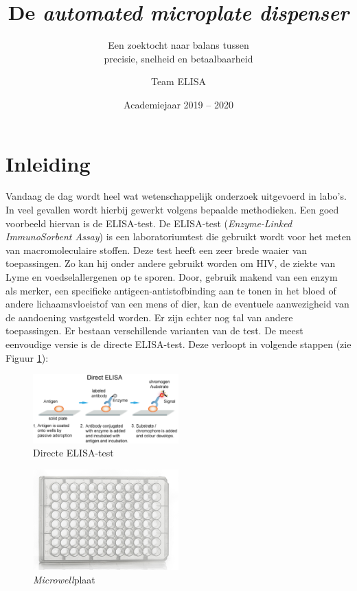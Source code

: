 \documentclass[a4paper,twoside,kulak]{kulakreport} %
\title{De \textit{automated microplate dispenser}}
\subtitle{Een zoektocht naar balans tussen \\ precisie, snelheid en betaalbaarheid}
\author{Team ELISA}
\institute{Matthias Derez, Maxime Dujardin, Korneel Verkens, Seppe Vilain \\
Begeleiders: Charlotte Dekimpe, Arvid Martens, Karen Vanhoorelbeke}
\date{Academiejaar 2019 -- 2020}
\begin{document}

\titlepage

\tableofcontents

\chapter*{Inleiding}

Vandaag de dag wordt heel wat wetenschappelijk onderzoek uitgevoerd in labo's. In veel gevallen wordt hierbij gewerkt volgens bepaalde methodieken. Een goed voorbeeld hiervan is de ELISA-test. De ELISA-test (\textit{Enzyme-Linked ImmunoSorbent Assay}\cite{naamELISA}) is een laboratoriumtest die gebruikt wordt voor het meten van macromoleculaire stoffen. Deze test heeft een zeer brede waaier van toepassingen. Zo kan hij onder andere gebruikt worden om HIV, de ziekte van Lyme en voedselallergenen op te sporen. Door, gebruik makend van een enzym als merker, een specifieke antigeen-antistofbinding aan te tonen in het bloed of andere lichaamsvloeistof van een mens of dier, kan de eventuele aanwezigheid van de aandoening vastgesteld worden. Er zijn echter nog tal van andere toepassingen\cite{ELISAApplications}.  
\newline
Er bestaan verschillende varianten van de test. De meest eenvoudige versie is de directe ELISA-test. Deze verloopt in volgende stappen (zie Figuur \ref{fig: directe ELISA})\cite{AfbeeldingdirectELISA}:

\begin{figure}[h]
	\centering
	\includegraphics[width=0.5\textwidth]{ELISA.png}
	\caption{Directe ELISA-test}
	\label{fig: directe ELISA}
	
\end{figure} 


\begin{figure}[h]
	\centering
	\includegraphics[width=0.5\textwidth]{microplate.png}
	\caption{\textit{Microwell}plaat}
	\label{fig: microwellplaat}
	
\end{figure} 
\end{document}
